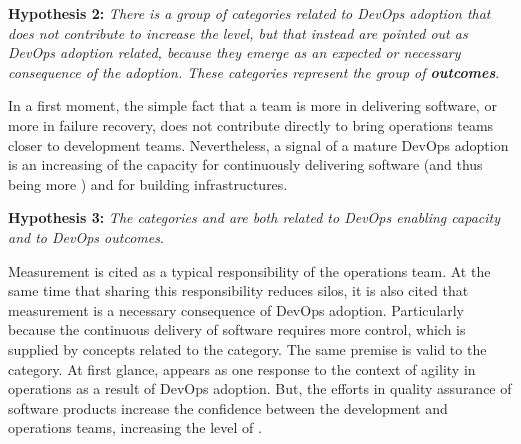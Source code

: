 
\begin{mh}
\textbf{Hypothesis 2:} \textit{There is a group of categories related to DevOps adoption
that does not contribute to increase the} \cc \emph{level, but that instead are
pointed out as DevOps adoption related, because they emerge as an expected or
necessary consequence of the adoption. These categories represent the group of
\textbf{outcomes}}.
\end{mh}

In a first moment, the simple fact that a team is more
 in delivering software, or more  in failure recovery, does not
contribute directly to bring operations teams closer to development teams.
Nevertheless, a signal of a mature DevOps adoption is an increasing of the capacity for continuously
delivering software (and thus being more )
and for building  infrastructures.

\begin{mh}
\textbf{Hypothesis 3:} \textit{The categories  and 
are both related to DevOps enabling capacity and to DevOps outcomes}.
\end{mh}

Measurement is cited as a typical responsibility of the operations team.
At the same time that sharing this responsibility reduces silos,
it is also cited that measurement is a necessary consequence of DevOps adoption. Particularly because
the continuous delivery of software requires more control,
which is supplied by concepts related to the  category.
The same premise is valid to the  category. At first glance,
 appears as one response to the context of agility in operations
as a result of DevOps adoption. But, the efforts in quality assurance of software products
increase the confidence between the development and operations teams, increasing the level
of \cc.

